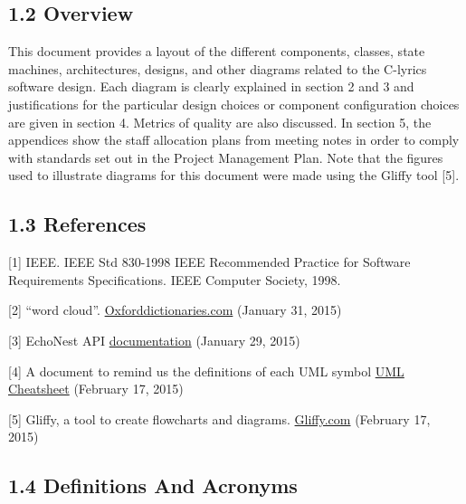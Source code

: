 \documentclass[]{article}
\begin{document}
\subsection{1.2 Overview}\label{overview}

This document provides a layout of the different components, classes,
state machines, architectures, designs, and other diagrams related to
the C-lyrics software design. Each diagram is clearly explained in
section 2 and 3 and justifications for the particular design choices or
component configuration choices are given in section 4. Metrics of
quality are also discussed. In section 5, the appendices show the staff
allocation plans from meeting notes in order to comply with standards
set out in the Project Management Plan. Note that the figures used to
illustrate diagrams for this document were made using the Gliffy tool
{[}5{]}.

\subsection{1.3 References}\label{references}

{[}1{]} IEEE. IEEE Std 830-1998 IEEE Recommended Practice for Software
Requirements Specifications. IEEE Computer Society, 1998.

{[}2{]} ``word cloud''.
\href{http://www.oxforddictionaries.com/us/definition/american_english/word-cloud}{Oxforddictionaries.com}
(January 31, 2015)

{[}3{]} EchoNest API
\href{http://developer.echonest.com/docs/v4/index.html\#overview}{documentation}
(January 29, 2015)

{[}4{]} A document to remind us the definitions of each UML symbol
\href{http://loufranco.com/wp-content/uploads/2012/11/cheatsheet.pdf}{UML
Cheatsheet} (February 17, 2015)

{[}5{]} Gliffy, a tool to create flowcharts and diagrams.
\href{https://www.gliffy.com}{Gliffy.com} (February 17, 2015)

\subsection{1.4 Definitions And
Acronyms}\label{definitions-and-acronyms}
\end{document}
